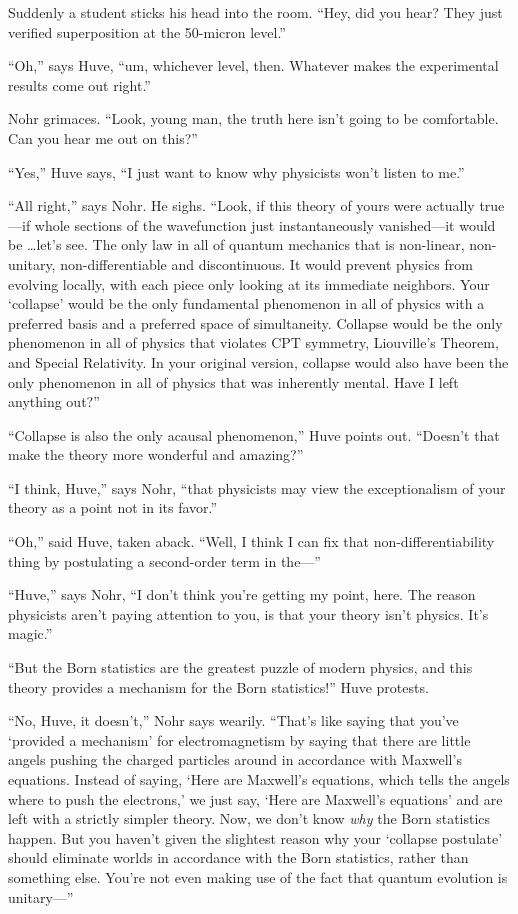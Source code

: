 {
 Suddenly a student sticks his head into the room.
``Hey, did you hear? They just verified superposition
at the 50-micron level.''}

{
 ``Oh,'' says Huve,
``um, whichever level, then. Whatever makes the
experimental results come out right.''}

{
 Nohr grimaces. ``Look, young man, the truth here
isn't going to be comfortable. Can you hear me out on
this?''}

{
 ``Yes,'' Huve says,
``I just want to know why physicists
won't listen to me.''}

{
 ``All right,'' says Nohr. He
sighs. ``Look, if this theory of yours were actually
true---if whole sections of the wavefunction just instantaneously
vanished---it would be \ldots let's see. The only law in
all of quantum mechanics that is non-linear, non-unitary,
non-differentiable and discontinuous. It would prevent physics from
evolving locally, with each piece only looking at its immediate
neighbors. Your `collapse' would be the
only fundamental phenomenon in all of physics with a preferred basis
and a preferred space of simultaneity. Collapse would be the only
phenomenon in all of physics that violates CPT symmetry,
Liouville's Theorem, and Special Relativity. In your
original version, collapse would also have been the only phenomenon in
all of physics that was inherently mental. Have I left anything
out?''}

{
 ``Collapse is also the only acausal
phenomenon,'' Huve points out.
``Doesn't that make the theory more
wonderful and amazing?''}

{
 ``I think, Huve,'' says Nohr,
``that physicists may view the exceptionalism of your
theory as a point not in its favor.''}

{
 ``Oh,'' said Huve, taken aback.
``Well, I think I can fix that non-differentiability
thing by postulating a second-order term in the---''}

{
 ``Huve,'' says Nohr,
``I don't think you're
getting my point, here. The reason physicists aren't
paying attention to you, is that your theory isn't
physics. It's magic.''}

{
 ``But the Born statistics are the greatest puzzle
of modern physics, and this theory provides a mechanism for the Born
statistics!'' Huve protests.}

{
 ``No, Huve, it
doesn't,'' Nohr says wearily.
``That's like saying that
you've `provided a
mechanism' for electromagnetism by saying that there
are little angels pushing the charged particles around in accordance
with Maxwell's equations. Instead of saying,
`Here are Maxwell's equations, which
tells the angels where to push the electrons,' we just
say, `Here are Maxwell's
equations' and are left with a strictly simpler theory.
Now, we don't know \textit{why} the Born statistics
happen. But you haven't given the slightest reason why
your `collapse postulate' should
eliminate worlds in accordance with the Born statistics, rather than
something else. You're not even making use of the fact
that quantum evolution is unitary---''}

